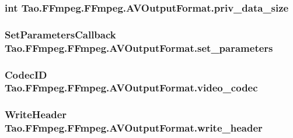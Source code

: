\label{struct_tao_1_1_f_fmpeg_1_1_f_fmpeg_1_1_a_v_output_format_a0231b2fc2e6909af40033fb3f693a1f8}
\hypertarget{struct_tao_1_1_f_fmpeg_1_1_f_fmpeg_1_1_a_v_output_format_a0f938a71bf67e8f0ab1464dee6339381}{
\subsubsection[{priv\_\-data\_\-size}]{\setlength{\rightskip}{0pt plus 5cm}int {\bf Tao.FFmpeg.FFmpeg.AVOutputFormat.priv\_\-data\_\-size}}}
\label{struct_tao_1_1_f_fmpeg_1_1_f_fmpeg_1_1_a_v_output_format_a0f938a71bf67e8f0ab1464dee6339381}
\hypertarget{struct_tao_1_1_f_fmpeg_1_1_f_fmpeg_1_1_a_v_output_format_a0589e29667153c7410abdbcc584c9f00}{
\subsubsection[{set\_\-parameters}]{\setlength{\rightskip}{0pt plus 5cm}SetParametersCallback {\bf Tao.FFmpeg.FFmpeg.AVOutputFormat.set\_\-parameters}}}
\label{struct_tao_1_1_f_fmpeg_1_1_f_fmpeg_1_1_a_v_output_format_a0589e29667153c7410abdbcc584c9f00}
\hypertarget{struct_tao_1_1_f_fmpeg_1_1_f_fmpeg_1_1_a_v_output_format_ac5a05c1f198825ca5b8c20a635d3de18}{
\subsubsection[{video\_\-codec}]{\setlength{\rightskip}{0pt plus 5cm}CodecID {\bf Tao.FFmpeg.FFmpeg.AVOutputFormat.video\_\-codec}}}
\label{struct_tao_1_1_f_fmpeg_1_1_f_fmpeg_1_1_a_v_output_format_ac5a05c1f198825ca5b8c20a635d3de18}
\hypertarget{struct_tao_1_1_f_fmpeg_1_1_f_fmpeg_1_1_a_v_output_format_a34713f8d6547dd169040adaf767094b0}{
\subsubsection[{write\_\-header}]{\setlength{\rightskip}{0pt plus 5cm}WriteHeader {\bf Tao.FFmpeg.FFmpeg.AVOutputFormat.write\_\-header}}}
